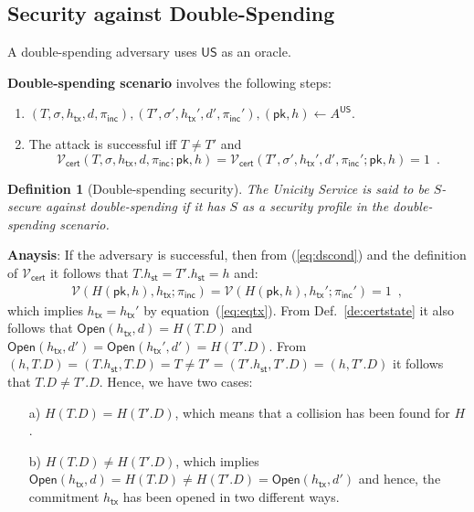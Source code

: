 \documentclass{article}
\newtheorem{definition}{Definition}[section]
\newcommand{\pubkey}[0]{\mathsf{pk}}
\newcommand{\open}[0]{\mathsf{Open}}
\newcommand{\unisrv}[0]{\mathsf{US}}
\newcommand{\sthash}[0]{h_\mathsf{st}}
\newcommand{\txhash}[0]{h_\mathsf{tx}}
\newcommand{\univer}[0]{\mathcal{V}}
\newcommand{\certver}[0]{\mathcal{V}_\mathsf{cert}}
\newcommand{\pinc}[0]{\pi_{\mathsf{inc}}}
\begin{document}
\subsection{Security against Double-Spending}

A double-spending adversary uses $\unisrv$ as an oracle. \medskip

\noindent\textbf{Double-spending scenario} involves the following steps:
\begin{enumerate}
\item $(T,\sigma,\txhash,d,\pinc),(T',\sigma',\txhash',d',\pinc'),(\pubkey,h)\gets A^\unisrv$.
\item The attack is successful iff $T\neq T'$ and
\begin{equation}\label{eq:dscond}
\certver(T,\sigma,\txhash,d,\pinc;\pubkey,h)=\certver(T',\sigma',\txhash',d',\pinc';\pubkey,h)=1 \enspace.
\end{equation}
\end{enumerate}

\begin{definition}[Double-spending security]
The Unicity Service is said to be $S$-secure against double-spending if it has $S$ as a security profile in the double-spending scenario.
\end{definition}

\noindent\textbf{Anaysis}: If the adversary is successful, then
from (\ref{eq:dscond}) and the definition of $\certver$ it follows that
$T.\sthash = T'.\sthash=h$ and:
\begin{eqnarray*}
\univer(H(\pubkey, h), \txhash; \pinc) = \univer(H(\pubkey, h), \txhash'; \pinc') = 1\enspace,
\end{eqnarray*}
which implies $\txhash=\txhash'$ by equation~(\ref{eq:eqtx}).
From Def.~\ref{de:certstate} it also follows that
$\open(\txhash,d)=H(T.D)$ and $\open(\txhash,d')=\open(\txhash',d')=H(T'.D)$.
From $(h,T.D)=(T.\sthash,T.D)=T\neq T'=(T'.\sthash,T'.D)=(h,T'.D)$ it follows that $T.D\neq T'.D$. Hence, we have two cases:
\begin{itemize}
\item[a)] $H(T.D)=H(T'.D)$, which
means that a collision has been found for $H$.
\item[b)] $H(T.D)\neq H(T'.D)$, which implies $\open(\txhash,d)=H(T.D)\neq H(T'.D)=\open(\txhash,d')$ and hence, the commitment $\txhash$ has been opened in two different ways.
\end{itemize}
\end{document}

